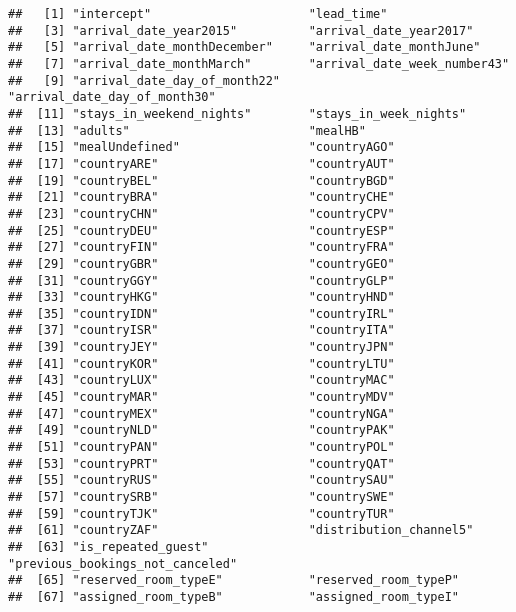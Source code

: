 \documentclass[
]{book}
\begin{document}
\begin{verbatim}
##   [1] "intercept"                      "lead_time"                     
##   [3] "arrival_date_year2015"          "arrival_date_year2017"         
##   [5] "arrival_date_monthDecember"     "arrival_date_monthJune"        
##   [7] "arrival_date_monthMarch"        "arrival_date_week_number43"    
##   [9] "arrival_date_day_of_month22"    "arrival_date_day_of_month30"   
##  [11] "stays_in_weekend_nights"        "stays_in_week_nights"          
##  [13] "adults"                         "mealHB"                        
##  [15] "mealUndefined"                  "countryAGO"                    
##  [17] "countryARE"                     "countryAUT"                    
##  [19] "countryBEL"                     "countryBGD"                    
##  [21] "countryBRA"                     "countryCHE"                    
##  [23] "countryCHN"                     "countryCPV"                    
##  [25] "countryDEU"                     "countryESP"                    
##  [27] "countryFIN"                     "countryFRA"                    
##  [29] "countryGBR"                     "countryGEO"                    
##  [31] "countryGGY"                     "countryGLP"                    
##  [33] "countryHKG"                     "countryHND"                    
##  [35] "countryIDN"                     "countryIRL"                    
##  [37] "countryISR"                     "countryITA"                    
##  [39] "countryJEY"                     "countryJPN"                    
##  [41] "countryKOR"                     "countryLTU"                    
##  [43] "countryLUX"                     "countryMAC"                    
##  [45] "countryMAR"                     "countryMDV"                    
##  [47] "countryMEX"                     "countryNGA"                    
##  [49] "countryNLD"                     "countryPAK"                    
##  [51] "countryPAN"                     "countryPOL"                    
##  [53] "countryPRT"                     "countryQAT"                    
##  [55] "countryRUS"                     "countrySAU"                    
##  [57] "countrySRB"                     "countrySWE"                    
##  [59] "countryTJK"                     "countryTUR"                    
##  [61] "countryZAF"                     "distribution_channel5"         
##  [63] "is_repeated_guest"              "previous_bookings_not_canceled"
##  [65] "reserved_room_typeE"            "reserved_room_typeP"           
##  [67] "assigned_room_typeB"            "assigned_room_typeI"           

\end{verbatim}
\end{document}
